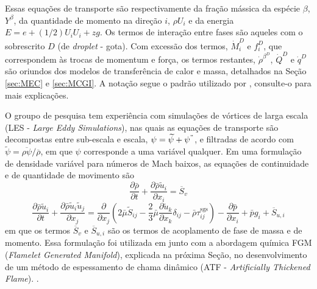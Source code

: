 Essas equações de transporte são respectivamente da fração mássica da espécie $\beta$, $Y^\beta$, da quantidade de momento na direção $i$, $\rho U_i$ e da energia $E=e+(1/2)U_iU_i+zg$. 
Os termos de interação entre fases são aqueles com o sobrescrito $D$ (de \emph{droplet} - gota).
Com excessão dos termos, $\dot M_i^D$ e $f_i^D$, que correspondem às trocas de momentum e força, os termos restantes, $\dot \rho^{\beta^D}$, $\dot Q^D$ e $\dot q^D$ são oriundos dos modelos de transferência de calor e massa, detalhados na Seção \ref{sec:MEC} e \ref{sec:MCGI}. 
A notação segue o padrão utilizado por \cite{JennyB2012}, consulte-o para mais explicações.

O groupo de pesquisa tem experiência com simulações de vórtices de larga escala (LES - \emph{Large Eddy Simulations}), nas quais as equações de transporte são decompostas entre sub-escala e escala, $\psi = \widetilde\psi + \psi^"$, e filtradas de acordo com $\widetilde\psi = \overline{\rho\psi}/\overline\rho$, em que $\psi$ corresponde a uma variável qualquer. 
Em uma formulação de densidade variável para números de Mach baixos, as equações de continuidade e de quantidade de movimento são
\begin{equation}
\frac{\partial \bar \rho}{\partial t} + 
\frac{\partial \bar \rho \widetilde u_i}{\partial x_i} = 
\overline S_v
\end{equation}
\begin{equation}
\frac{\partial \bar\rho \widetilde u_i}{\partial t} + 
\frac{\partial \bar\rho \widetilde u_i \widetilde u_j}{\partial x_j} =
\frac{\partial }{\partial x_j} \left(
	2\bar\mu \widetilde S_{ij} -
	\frac{2}{3}\bar\mu \frac{\partial \widetilde u_k}{\partial x_k} \delta_{ij} -
	\bar\rho \tau_{ij}^{\text{sgs}}
\right) -
\frac{\partial \bar p}{\partial x_i} +
\bar p g_i + 
\overline S_{u,i}
\end{equation}
em que os termos $\overline S_v$ e $\overline S_{u,i}$ são os termos de acoplamento de fase de massa e de momento. Essa formulação foi utilizada em \cite{SacomanoF2017PhD, SacomanoF2017CF, SacomanoF2020CF} junto com a abordagem química FGM (\emph{Flamelet Generated Manifold}), explicada na próxima Seção, no desenvolvimento de um método de espessamento de chama dinâmico (ATF - \emph{Artificially Thickened Flame}).
.


